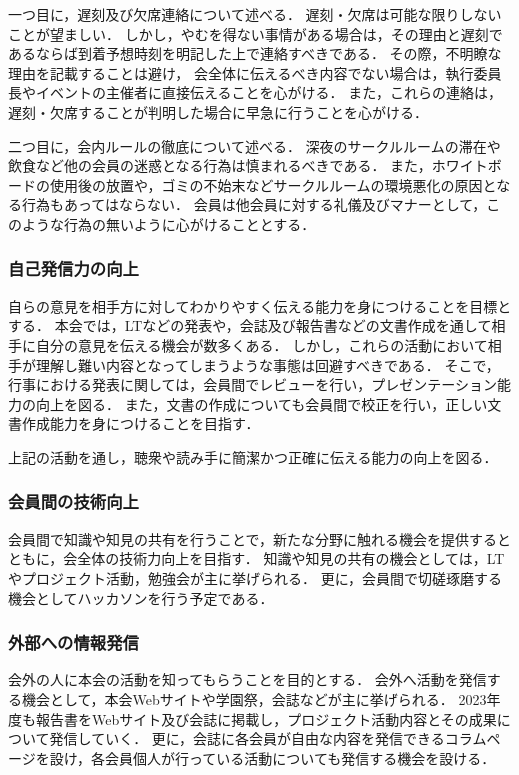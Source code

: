 一つ目に，遅刻及び欠席連絡について述べる．
遅刻・欠席は可能な限りしないことが望ましい．
しかし，やむを得ない事情がある場合は，その理由と遅刻であるならば到着予想時刻を明記した上で連絡すべきである．
その際，不明瞭な理由を記載することは避け，
会全体に伝えるべき内容でない場合は，執行委員長やイベントの主催者に直接伝えることを心がける．
また，これらの連絡は，遅刻・欠席することが判明した場合に早急に行うことを心がける．

二つ目に，会内ルールの徹底について述べる．
深夜のサークルルームの滞在や飲食など他の会員の迷惑となる行為は慎まれるべきである．
また，ホワイトボードの使用後の放置や，ゴミの不始末などサークルルームの環境悪化の原因となる行為もあってはならない．
会員は他会員に対する礼儀及びマナーとして，このような行為の無いように心がけることとする．

\subsubsection*{自己発信力の向上}
自らの意見を相手方に対してわかりやすく伝える能力を身につけることを目標とする．
本会では，LTなどの発表や，会誌及び報告書などの文書作成を通して相手に自分の意見を伝える機会が数多くある．
しかし，これらの活動において相手が理解し難い内容となってしまうような事態は回避すべきである．
そこで，行事における発表に関しては，会員間でレビューを行い，プレゼンテーション能力の向上を図る．
また，文書の作成についても会員間で校正を行い，正しい文書作成能力を身につけることを目指す．

上記の活動を通し，聴衆や読み手に簡潔かつ正確に伝える能力の向上を図る．

\subsubsection*{会員間の技術向上}
会員間で知識や知見の共有を行うことで，新たな分野に触れる機会を提供するとともに，会全体の技術力向上を目指す．
知識や知見の共有の機会としては，LTやプロジェクト活動，勉強会が主に挙げられる．
更に，会員間で切磋琢磨する機会としてハッカソンを行う予定である．

\subsubsection*{外部への情報発信}
会外の人に本会の活動を知ってもらうことを目的とする．
会外へ活動を発信する機会として，本会Webサイトや学園祭，会誌などが主に挙げられる．
2023年度も報告書をWebサイト及び会誌に掲載し，プロジェクト活動内容とその成果について発信していく．
更に，会誌に各会員が自由な内容を発信できるコラムページを設け，各会員個人が行っている活動についても発信する機会を設ける．

